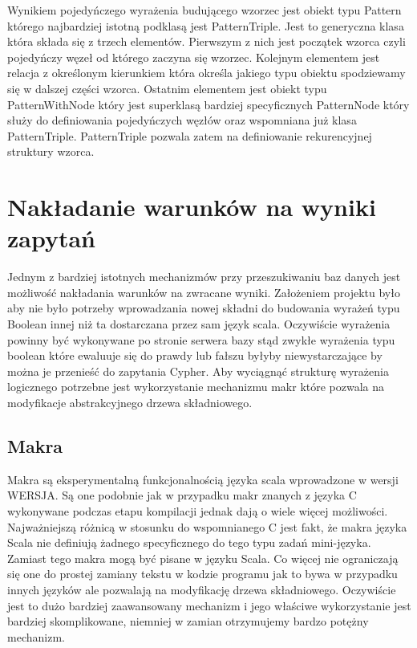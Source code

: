 \documentclass[brudnopis]{xmgr}
\begin{document}


Wynikiem pojedyńczego wyrażenia budującego wzorzec jest obiekt typu Pattern którego najbardziej istotną podklasą jest PatternTriple. Jest to generyczna klasa która składa się z trzech elementów. Pierwszym z nich jest początek wzorca czyli pojedyńczy węzeł od którego zaczyna się wzorzec. Kolejnym elementem jest relacja z określonym kierunkiem która określa jakiego typu obiektu spodziewamy się w dalszej części wzorca. Ostatnim elementem jest obiekt typu PatternWithNode który jest superklasą bardziej specyficznych PatternNode który służy do definiowania pojedyńczych węzłów oraz wspomniana już klasa PatternTriple. PatternTriple pozwala zatem na definiowanie rekurencyjnej struktury wzorca.

\section{Nakładanie warunków na wyniki zapytań}

Jednym z bardziej istotnych mechanizmów przy przeszukiwaniu baz danych jest możliwość nakładania warunków na zwracane wyniki. Założeniem projektu było aby nie było potrzeby wprowadzania nowej składni do budowania wyrażeń typu Boolean innej niż ta dostarczana przez sam język scala. Oczywiście wyrażenia powinny być wykonywane po stronie serwera bazy stąd zwykłe wyrażenia typu boolean które ewaluuje się do prawdy lub fałszu byłyby niewystarczające by można je przenieść do zapytania Cypher. Aby wyciągnąć strukturę wyrażenia logicznego potrzebne jest wykorzystanie mechanizmu makr które pozwala na modyfikacje abstrakcyjnego drzewa składniowego.

\subsection{Makra}

Makra są eksperymentalną funkcjonalnością języka scala wprowadzone w wersji WERSJA. Są one podobnie jak w przypadku makr znanych z języka C wykonywane podczas etapu kompilacji jednak dają o wiele więcej możliwości. Najważniejszą różnicą w stosunku do wspomnianego C jest fakt, że makra języka Scala nie definiują żadnego specyficznego do tego typu zadań mini-języka. Zamiast tego makra mogą być pisane w języku Scala. Co więcej nie ograniczają się one do prostej zamiany tekstu w kodzie programu jak to bywa w przypadku innych języków ale pozwalają na modyfikację drzewa składniowego. Oczywiście jest to dużo bardziej zaawansowany mechanizm i jego właściwe wykorzystanie jest bardziej skomplikowane, niemniej w zamian otrzymujemy bardzo potężny mechanizm.
\end{document}
